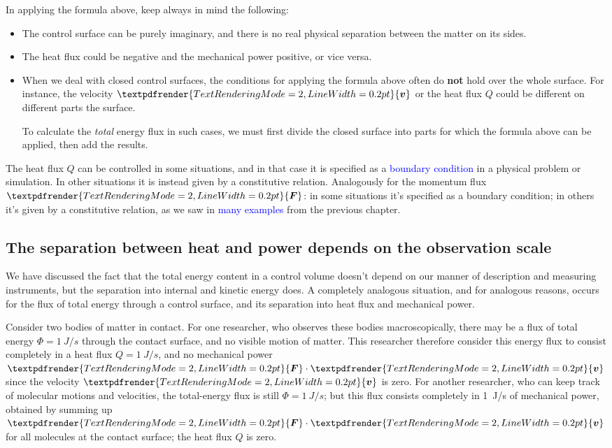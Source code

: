 \documentclass[a4paper,12pt,%
onecolumn,oneside,%
british%
]{memoir}
\renewcommand*{\bm}[1]{\textpdfrender{TextRenderingMode=2,LineWidth=0.2pt}{\boldsymbol{#1}}}
\renewcommand*{\|}[1][]{\nonscript\:#1\vert\nonscript\:\mathopen{}}
\newcommand*{\sect}{\S}%
\renewcommand*{\autoref}[2]{\sidepar{\vspace{-1ex}\footnotesize{\color{blue}\faIcon{%
angle-right%
}\enspace\sect~\ref{#1} page~\pageref{#1}}}\textcolor{blue}{#2}}
\newcommand*{\yv}{\bm{v}}
\newcommand*{\yH}{\varPhi}%
\newcommand*{\yQ}{Q}%
\newcommand*{\yF}{\bm{F}}
\begin{document}
\begin{warning}[Tricky points in applying the energy-flux formula,label={warn:energyflux}]
In applying the formula above, keep always in mind the following:
\begin{itemize}
\item The control surface can be purely imaginary, and there is no real physical separation between the matter on its sides.

\item The heat flux could be negative and the mechanical power positive, or vice versa.

\item When we deal with closed control surfaces, the conditions for applying the formula above often do \textbf{not} hold over the whole surface. For instance, the velocity $\yv$ or the heat flux $\yQ$ could be different on different parts the surface.

  To calculate the \emph{total} energy flux in such cases, we  must first divide the closed surface into parts for which the formula above can be applied, then add the results.
\end{itemize}
\end{warning}

The heat flux $\yQ$ can be controlled in some situations, and in that case it is specified as a \autoref{sec:boundary_conds}{boundary condition} in a physical problem or simulation. In other situations it is instead given by a constitutive relation. Analogously for the momentum flux $\yF$: in some situations it's specified as a boundary condition; in others it's given by a constitutive relation, as we saw in \autoref{sec:momentum_constitutive}{many examples} from the previous chapter.


\subsection{The separation between heat and power depends on the observation scale}
\label{sec:dependence_energyfluxdivision}

We have discussed the fact that the total energy content in a control volume doesn't depend on our manner of description and measuring instruments, but the separation into internal and kinetic energy does. A completely analogous situation, and for analogous reasons, occurs for the flux of total energy through a control surface, and its separation into heat flux and mechanical power.

Consider two bodies of matter in contact. For one researcher, who observes these bodies macroscopically, there may be a flux of total energy $\yH=\qty{1}{J/s}$ through the contact surface, and no visible motion of matter. This researcher therefore consider this energy flux to consist completely in a heat flux $\yQ=\qty{1}{J/s}$, and no mechanical power $\yF\cdot\yv$ since the velocity $\yv$ is zero. For another researcher, who can keep track of molecular motions and velocities, the total-energy flux is still $\yH=\qty{1}{J/s}$; but this flux consists completely in \qty{1}{J/s} of mechanical power, obtained by summing up $\yF\cdot\yv$ for all molecules at the contact surface; the heat flux $\yQ$ is zero.
\end{document}
